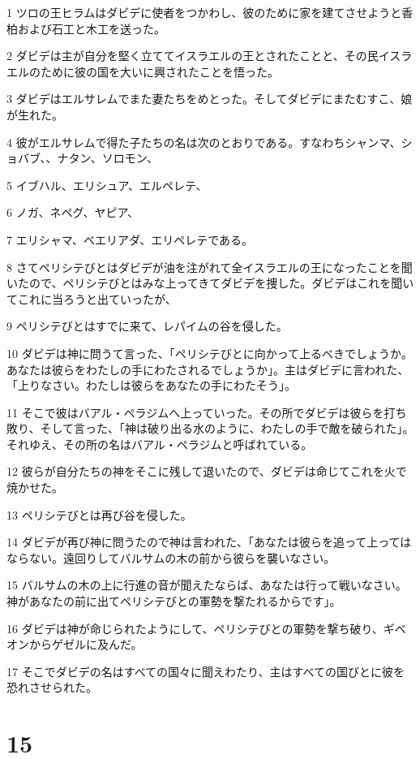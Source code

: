 \par 1 ツロの王ヒラムはダビデに使者をつかわし、彼のために家を建てさせようと香柏および石工と木工を送った。
\par 2 ダビデは主が自分を堅く立ててイスラエルの王とされたことと、その民イスラエルのために彼の国を大いに興されたことを悟った。
\par 3 ダビデはエルサレムでまた妻たちをめとった。そしてダビデにまたむすこ、娘が生れた。
\par 4 彼がエルサレムで得た子たちの名は次のとおりである。すなわちシャンマ、ショバブ、、ナタン、ソロモン、
\par 5 イブハル、エリシュア、エルペレテ、
\par 6 ノガ、ネペグ、ヤピア、
\par 7 エリシャマ、ベエリアダ、エリペレテである。
\par 8 さてペリシテびとはダビデが油を注がれて全イスラエルの王になったことを聞いたので、ペリシテびとはみな上ってきてダビデを捜した。ダビデはこれを聞いてこれに当ろうと出ていったが、
\par 9 ペリシテびとはすでに来て、レパイムの谷を侵した。
\par 10 ダビデは神に問うて言った、「ペリシテびとに向かって上るべきでしょうか。あなたは彼らをわたしの手にわたされるでしょうか」。主はダビデに言われた、「上りなさい。わたしは彼らをあなたの手にわたそう」。
\par 11 そこで彼はバアル・ペラジムへ上っていった。その所でダビデは彼らを打ち敗り、そして言った、「神は破り出る水のように、わたしの手で敵を破られた」。それゆえ、その所の名はバアル・ペラジムと呼ばれている。
\par 12 彼らが自分たちの神をそこに残して退いたので、ダビデは命じてこれを火で焼かせた。
\par 13 ペリシテびとは再び谷を侵した。
\par 14 ダビデが再び神に問うたので神は言われた、「あなたは彼らを追って上ってはならない。遠回りしてバルサムの木の前から彼らを襲いなさい。
\par 15 バルサムの木の上に行進の音が聞えたならば、あなたは行って戦いなさい。神があなたの前に出てペリシテびとの軍勢を撃たれるからです」。
\par 16 ダビデは神が命じられたようにして、ペリシテびとの軍勢を撃ち破り、ギベオンからゲゼルに及んだ。
\par 17 そこでダビデの名はすべての国々に聞えわたり、主はすべての国びとに彼を恐れさせられた。

\chapter{15}

